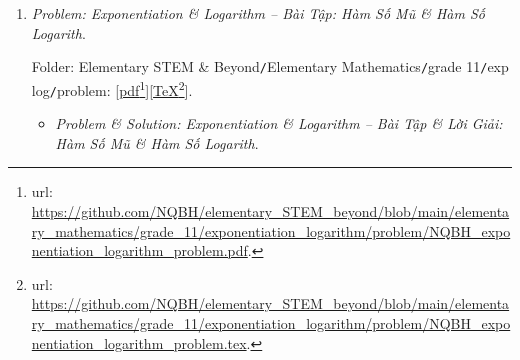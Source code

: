 \documentclass[12pt]{article}
\begin{document}
\begin{enumerate}
	Folder: {\sf Elementary STEM \& Beyond{\tt/}Elementary Mathematics{\tt/}grade 11{\tt/}probability \& statistics{\tt/}problem}: [\href{https://github.com/NQBH/elementary_STEM_beyond/blob/main/elementary_mathematics/grade_11/probability_statistics/problem/NQBH_probability_statistics_problem.pdf}{pdf}\footnote{{\sc url}: \url{https://github.com/NQBH/elementary_STEM_beyond/blob/main/elementary_mathematics/grade_11/probability_statistics/problem/NQBH_probability_statistics_problem.pdf}.}][\href{https://github.com/NQBH/elementary_STEM_beyond/blob/main/elementary_mathematics/grade_11/probability_statistics/problem/NQBH_probability_statistics_problem.tex}{\TeX}\footnote{{\sc url}: \url{https://github.com/NQBH/elementary_STEM_beyond/blob/main/elementary_mathematics/grade_11/probability_statistics/problem/NQBH_probability_statistics_problem.tex}.}].
	\begin{itemize}
		\item {\it Problem \& Solution: Probability \& Statistics -- Bài Tập \& Lời Giải: Xác Suất \& Thống Kê}.
		
		Folder: {\sf Elementary STEM \& Beyond{\tt/}Elementary Mathematics{\tt/}grade 11{\tt/}probability \& statistics{\tt/}solution}: [\href{https://github.com/NQBH/elementary_STEM_beyond/blob/main/elementary_mathematics/grade_11/probability_statistics/solution/NQBH_probability_statistics_solution.pdf}{pdf}\footnote{{\sc url}: \url{https://github.com/NQBH/elementary_STEM_beyond/blob/main/elementary_mathematics/grade_11/probability_statistics/solution/NQBH_probability_statistics_solution.pdf}.}][\href{https://github.com/NQBH/elementary_STEM_beyond/blob/main/elementary_mathematics/grade_11/probability_statistics/solution/NQBH_probability_statistics_solution.tex}{\TeX}\footnote{{\sc url}: \url{https://github.com/NQBH/elementary_STEM_beyond/blob/main/elementary_mathematics/grade_11/probability_statistics/solution/NQBH_probability_statistics_solution.tex}.}].
	\end{itemize}	
	\item {\it Problem: Exponentiation \& Logarithm -- Bài Tập: Hàm Số Mũ \& Hàm Số Logarith}.
	
	Folder: {\sf Elementary STEM \& Beyond{\tt/}Elementary Mathematics{\tt/}grade 11{\tt/}exp log{\tt/}problem}: [\href{https://github.com/NQBH/elementary_STEM_beyond/blob/main/elementary_mathematics/grade_11/exponentiation_logarithm/problem/NQBH_exponentiation_logarithm_problem.pdf}{pdf}\footnote{{\sc url}: \url{https://github.com/NQBH/elementary_STEM_beyond/blob/main/elementary_mathematics/grade_11/exponentiation_logarithm/problem/NQBH_exponentiation_logarithm_problem.pdf}.}][\href{https://github.com/NQBH/elementary_STEM_beyond/blob/main/elementary_mathematics/grade_11/exponentiation_logarithm/problem/NQBH_exponentiation_logarithm_problem.tex}{\TeX}\footnote{{\sc url}: \url{https://github.com/NQBH/elementary_STEM_beyond/blob/main/elementary_mathematics/grade_11/exponentiation_logarithm/problem/NQBH_exponentiation_logarithm_problem.tex}.}].
	\begin{itemize}
		\item {\it Problem \& Solution: Exponentiation \& Logarithm -- Bài Tập \& Lời Giải: Hàm Số Mũ \& Hàm Số Logarith}.
		

\end{itemize}
\end{enumerate}
\end{document}
